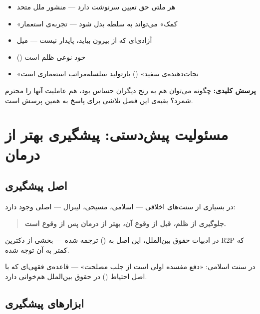 \begin{tcolorbox}[failbox, title={از سوی دیگر: احترام به عاملیت}]
\begin{itemize}
\item هر ملتی حق تعیین سرنوشت دارد — منشور ملل متحد
\item «کمک» می‌تواند به سلطه بدل شود — تجربه‌ی استعمار
\item آزادی‌ای که از بیرون بیاید، پایدار نیست — میل
\item {} () خود نوعی ظلم است
\item «نجات‌دهنده‌ی سفید» () بازتولید سلسله‌مراتب
  استعماری است
\end{itemize}
\end{tcolorbox}

\textbf{پرسش کلیدی:} چگونه می‌توان هم به رنج دیگران حساس بود، هم
عاملیت آنها را محترم شمرد؟ بقیه‌ی این فصل تلاشی برای پاسخ به همین
پرسش است.


\section{مسئولیت پیش‌دستی: پیشگیری بهتر از درمان}
\label{sec:ch17-prevention}

\subsection{اصل پیشگیری}

\begin{tcolorbox}[legalbox, title={مسئولیت پیشگیری}]
در بسیاری از سنت‌های اخلاقی — اسلامی، مسیحی، لیبرال — اصلی وجود دارد:

\begin{quote}
\textbf{جلوگیری از ظلم، قبل از وقوع آن، بهتر از درمان پس از وقوع است.}
\end{quote}

در ادبیات حقوق بین‌الملل، این اصل به 
() ترجمه شده — بخشی از دکترین R2P که کمتر
به آن توجه شده.

در سنت اسلامی: «دفع مفسده اولی است از جلب مصلحت» — قاعده‌ی فقهی‌ای که
با اصل احتیاط () در حقوق بین‌الملل هم‌خوانی
دارد.
\end{tcolorbox}


\subsection{ابزارهای پیشگیری}

